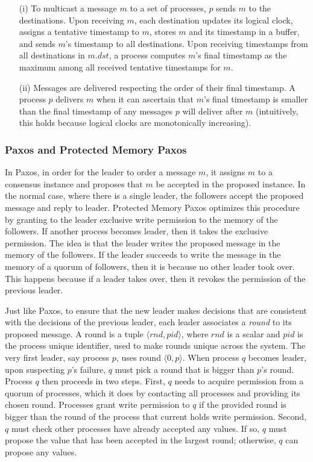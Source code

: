 \begin{itemize}
\item[(i)] To multicast a message $m$ to a set of processes, $p$ sends $m$ to the destinations.
Upon receiving $m$, each destination updates its logical clock, assigns a tentative timestamp to $m$, stores $m$ and its timestamp in a buffer, and sends $m$'s timestamp to all destinations.
Upon receiving timestamps from all destinations in $m.dst$, a process computes $m$'s final timestamp as the maximum among all received tentative timestamps for $m$.
\item[(ii)]Messages are delivered respecting the order of their final timestamp.
A process $p$ delivers $m$ when it can ascertain that $m$'s final timestamp is smaller than the final timestamp of any messages $p$ will deliver after $m$ (intuitively, this holds because logical clocks are monotonically increasing).
\end{itemize}

\subsubsection{Paxos and Protected Memory Paxos}

In Paxos, in order for the leader to order a message $m$, it assigns $m$ to a consensus instance and proposes that $m$ be accepted in the proposed instance.
In the normal case, where there is a single leader, the followers accept the proposed message and reply to leader.
Protected Memory Paxos optimizes this procedure by granting to the leader exclusive write permission to the memory of the followers.
If another process becomes leader, then it takes the exclusive permission.
The idea is that the leader writes the proposed message in the memory of the followers.
If the leader succeeds to write the message in the memory of a quorum of followers, then it is because no other leader took over.
This happens because if a leader takes over, then it revokes the permission of the previous leader.

Just like Paxos, to ensure that the new leader makes decisions that are consistent with the decisions of the previous leader, each leader associates a \emph{round} to its proposed message.
A round is a tuple $\langle rnd, pid \rangle$, where $rnd$ is a scalar and $pid$ is the process unique identifier, used to make rounds unique across the system.
The very first leader, say process $p$, uses round $\langle 0, p \rangle$.
When process $q$ becomes leader, upon suspecting $p$'s failure, $q$ must pick a round that is bigger than $p$'s round.
Process $q$ then proceeds in two steps.
First, $q$ needs to acquire permission from a quorum of processes, which it does by contacting all processes and providing its chosen round.
Processes grant write permission to $q$ if the provided round is bigger than the round of the process that current holds write permission.
Second, $q$ must check other processes have already accepted any values.
If so, $q$ must propose the value that has been accepted in the largest round; otherwise, $q$ can propose any values.

